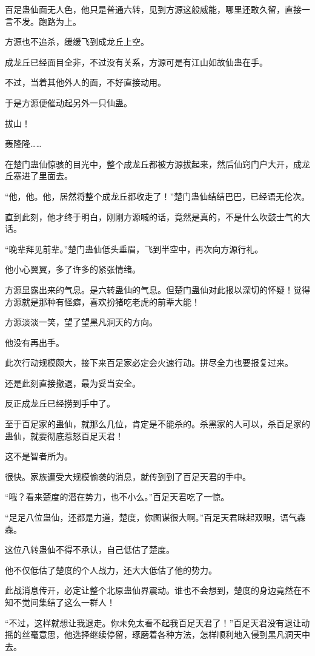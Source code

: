 \begin{this_body}
百足蛊仙面无人色，他只是普通六转，见到方源这般威能，哪里还敢久留，直接一言不发。跑路为上。

方源也不追杀，缓缓飞到成龙丘上空。

成龙丘已经面目全非，不过没有关系，方源可是有江山如故仙蛊在手。

不过，当着其他外人的面，不好直接动用。

于是方源便催动起另外一只仙蛊。

拔山！

轰隆隆……

在楚门蛊仙惊骇的目光中，整个成龙丘都被方源拔起来，然后仙窍门户大开，成龙丘塞进了里面去。

“他，他。他，居然将整个成龙丘都收走了！”楚门蛊仙结结巴巴，已经语无伦次。

直到此刻，他才终于明白，刚刚方源喊的话，竟然是真的，不是什么吹鼓士气的大话。

“晚辈拜见前辈。”楚门蛊仙低头垂眉，飞到半空中，再次向方源行礼。

他小心翼翼，多了许多的紧张情绪。

方源显露出来的气息。是六转蛊仙的气息。但楚门蛊仙对此报以深切的怀疑！觉得方源就是那种有怪癖，喜欢扮猪吃老虎的前辈大能！

方源淡淡一笑，望了望黑凡洞天的方向。

他没有再出手。

此次行动规模颇大，接下来百足家必定会火速行动。拼尽全力也要报复过来。

还是此刻直接撤退，最为妥当安全。

反正成龙丘已经捞到手中了。

至于百足家的蛊仙，就那么几位，肯定是不能杀的。杀黑家的人可以，杀百足家的蛊仙，就要彻底惹怒百足天君！

这不是智者所为。

很快。家族遭受大规模偷袭的消息，就传到到了百足天君的手中。

“哦？看来楚度的潜在势力，也不小么。”百足天君吃了一惊。

“足足八位蛊仙，还都是力道，楚度，你图谋很大啊。”百足天君眯起双眼，语气森森。

这位八转蛊仙不得不承认，自己低估了楚度。

他不仅低估了楚度的个人战力，还大大低估了他的势力。

此战消息传开，必定让整个北原蛊仙界震动。谁也不会想到，楚度的身边竟然在不知不觉间集结了这么一群人！

“不过，这样就想让我退走。你未免太看不起我百足天君了！”百足天君没有退让动摇的丝毫意思，他选择继续停留，琢磨着各种方法，怎样顺利地入侵到黑凡洞天中去。


\end{this_body}

